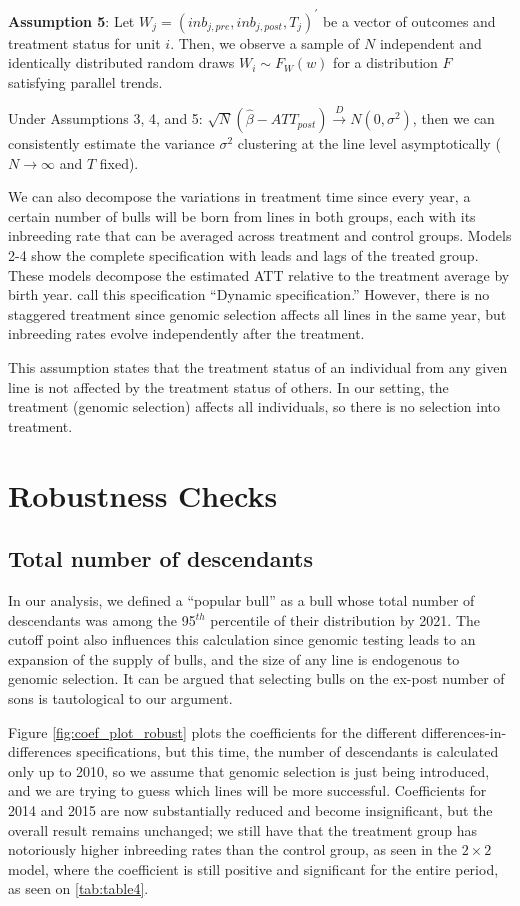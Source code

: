 \documentclass[12pt,letterpaper]{article}
\begin{document}
\medskip
\textbf{Assumption 5}: Let $W_{j}=(inb_{j,pre}, inb_{j,post}, T_{j})^{'}$ be a vector of outcomes and treatment status for unit $i$. Then, we observe a sample of $N$  independent and identically distributed random draws $W_{i}\sim F_{W}(w)$ for a distribution $F$ satisfying parallel trends.

Under Assumptions 3, 4, and 5: $\sqrt{N}(\hat{\beta}-ATT_{post})\overset{D}{\rightarrow} N(0, \sigma^{2})$, then we can consistently estimate the variance $\sigma^{2}$ clustering at the line level \citep{Bertrand2004} asymptotically ($N\rightarrow\infty$ and $T$ fixed).

We can also decompose the variations in treatment time since every year, a certain number of bulls will be born from lines in both groups, each with its inbreeding rate that can be averaged across treatment and control groups. Models 2-4 show the complete specification with leads and lags of the treated group. These models decompose the estimated ATT relative to the treatment average by birth year. \cite{Sun2021} call this specification ``Dynamic specification.'' However, there is no staggered treatment since genomic selection affects all lines in the same year, but inbreeding rates evolve independently after the treatment. 

This assumption states that the treatment status of an individual from any given line is not affected by the treatment status of others. In our setting, the treatment (genomic selection) affects all individuals, so there is no selection into treatment.
\section{Robustness Checks\label{subsec:robustness}}
\subsection{Total number of descendants\label{suvsubsec:progeny}}

In our analysis, we defined a ``popular bull'' as a bull whose total number of descendants was among the 95$^{th}$ percentile of their distribution by 2021. The cutoff point also influences this calculation since genomic testing leads to an expansion of the supply of bulls, and the size of any line is endogenous to genomic selection. It can be argued that selecting bulls on the ex-post number of sons is tautological to our argument.

Figure \ref{fig:coef_plot_robust} plots the coefficients for the different differences-in-differences specifications, but this time, the number of descendants is calculated only up to 2010, so we assume that genomic selection is just being introduced, and we are trying to guess which lines will be more successful. Coefficients for 2014 and 2015 are now substantially reduced and become insignificant, but the overall result remains unchanged; we still have that the treatment group has notoriously higher inbreeding rates than the control group, as seen in the $2\times 2$ model, where the coefficient is still positive and significant for the entire period, as seen on \ref{tab:table4}.
\end{document}
